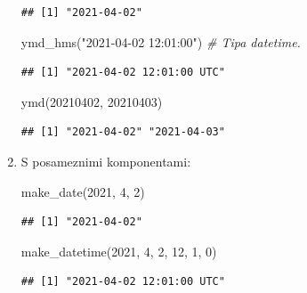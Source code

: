 \documentclass[
]{book}
\newenvironment{Shaded}{\begin{snugshade}}{\end{snugshade}}
\newcommand{\CommentTok}[1]{\textcolor[rgb]{0.56,0.35,0.01}{\textit{#1}}}
\newcommand{\DecValTok}[1]{\textcolor[rgb]{0.00,0.00,0.81}{#1}}
\newcommand{\FunctionTok}[1]{\textcolor[rgb]{0.00,0.00,0.00}{#1}}
\newcommand{\NormalTok}[1]{#1}
\newcommand{\StringTok}[1]{\textcolor[rgb]{0.31,0.60,0.02}{#1}}
\begin{document}
\begin{enumerate}
\begin{verbatim}
## [1] "2021-04-02"
\end{verbatim}

\begin{Shaded}
\begin{Highlighting}[]
\FunctionTok{ymd\_hms}\NormalTok{(}\StringTok{"2021{-}04{-}02 12:01:00"}\NormalTok{) }\CommentTok{\# Tipa datetime.}
\end{Highlighting}
\end{Shaded}

\begin{verbatim}
## [1] "2021-04-02 12:01:00 UTC"
\end{verbatim}

\begin{Shaded}
\begin{Highlighting}[]
\FunctionTok{ymd}\NormalTok{(}\DecValTok{20210402}\NormalTok{, }\DecValTok{20210403}\NormalTok{)}
\end{Highlighting}
\end{Shaded}

\begin{verbatim}
## [1] "2021-04-02" "2021-04-03"
\end{verbatim}
\item
  S posameznimi komponentami:

\begin{Shaded}
\begin{Highlighting}[]
\FunctionTok{make\_date}\NormalTok{(}\DecValTok{2021}\NormalTok{, }\DecValTok{4}\NormalTok{, }\DecValTok{2}\NormalTok{)}
\end{Highlighting}
\end{Shaded}

\begin{verbatim}
## [1] "2021-04-02"
\end{verbatim}

\begin{Shaded}
\begin{Highlighting}[]
\FunctionTok{make\_datetime}\NormalTok{(}\DecValTok{2021}\NormalTok{, }\DecValTok{4}\NormalTok{, }\DecValTok{2}\NormalTok{, }\DecValTok{12}\NormalTok{, }\DecValTok{1}\NormalTok{, }\DecValTok{0}\NormalTok{)}
\end{Highlighting}
\end{Shaded}

\begin{verbatim}
## [1] "2021-04-02 12:01:00 UTC"
\end{verbatim}
\end{enumerate}
\end{document}
